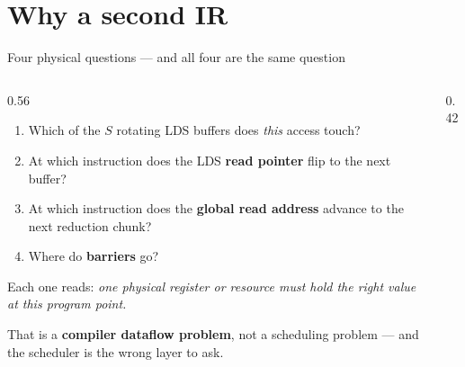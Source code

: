 \documentclass[aspectratio=169,9pt]{beamer}
\newcommand{\tsub}[1]{{\footnotesize\color{gray}#1}}
\newcommand{\key}[1]{\textcolor{acc}{\textbf{#1}}}
\newcommand{\good}[1]{\textcolor{ok}{\textbf{#1}}}
\begin{document}
\section{Why a second IR}

\begin{frame}{Four physical questions --- and all four are the same question}
\begin{columns}[T]
\begin{column}{0.56\textwidth}
\begin{enumerate}\scriptsize
  \item Which of the $S$ rotating LDS buffers does \emph{this} access touch?
  \item At which instruction does the LDS \key{read pointer} flip to the next buffer?
  \item At which instruction does the \key{global read address} advance to the next reduction chunk?
  \item Where do \key{barriers} go?
\end{enumerate}
\vspace{4pt}
\scriptsize
Each one reads: \emph{one physical register or resource must hold the right value
at this program point.}
\vspace{3pt}

That is a \good{compiler dataflow problem}, not a scheduling problem --- and the
scheduler is the wrong layer to ask.
\end{column}
\begin{column}{0.42\textwidth}
\centering
{}
\end{column}
\end{columns}
\end{frame}
\end{document}
